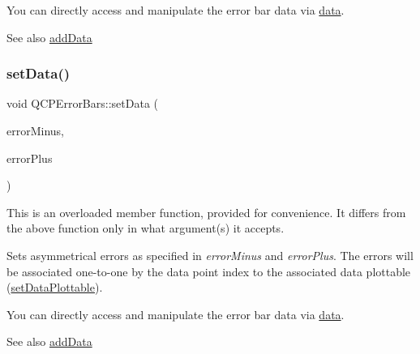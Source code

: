 You can directly access and manipulate the error bar data via \hyperlink{class_q_c_p_error_bars_aeebd1b14f4c3573565efafd514988813}{data}.

\begin{DoxySeeAlso}{See also}
\hyperlink{class_q_c_p_error_bars_aae296ad9817b3fa418db284af81cecf8}{add\+Data} 
\end{DoxySeeAlso}
\mbox{\label{class_q_c_p_error_bars_aac0cf070b957c11177e91b02bcb433c8}} 
\subsubsection{\texorpdfstring{set\+Data()}{setData()}\hspace{0.1cm}{\footnotesize\ttfamily [3/3]}}
{\footnotesize\ttfamily void Q\+C\+P\+Error\+Bars\+::set\+Data (\begin{DoxyParamCaption}\item[{const Q\+Vector$<$ double $>$ \&}]{error\+Minus,  }\item[{const Q\+Vector$<$ double $>$ \&}]{error\+Plus }\end{DoxyParamCaption})}

This is an overloaded member function, provided for convenience. It differs from the above function only in what argument(s) it accepts.

Sets asymmetrical errors as specified in {\itshape error\+Minus} and {\itshape error\+Plus}. The errors will be associated one-\/to-\/one by the data point index to the associated data plottable (\hyperlink{class_q_c_p_error_bars_aabb42a964cfbf780cd1c79850c7cd989}{set\+Data\+Plottable}).

You can directly access and manipulate the error bar data via \hyperlink{class_q_c_p_error_bars_aeebd1b14f4c3573565efafd514988813}{data}.

\begin{DoxySeeAlso}{See also}
\hyperlink{class_q_c_p_error_bars_aae296ad9817b3fa418db284af81cecf8}{add\+Data} 
\end{DoxySeeAlso}
\mbox{\label{class_q_c_p_error_bars_aabb42a964cfbf780cd1c79850c7cd989}} 
